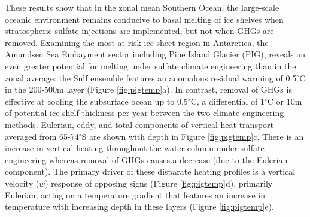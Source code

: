 \documentclass[draft,grl]{AGUTeX}  %
\begin{document}
\begin{article}
These results show that in the zonal mean Southern Ocean, the large-scale oceanic environment remains conducive to basal melting of ice shelves when stratospheric sulfate injections are implemented, but not when GHGs are removed. Examining the most at-risk ice sheet region in Antarctica, the Amundsen Sea Embayment sector including Pine Island Glacier (PIG), reveals an even greater potential for melting under sulfate climate engineering than in the zonal average: the Sulf ensemble features an anomalous residual warming of 0.5$^\circ$C in the 200-500m layer (Figure \ref{fig:pigtemp}a). In contrast, removal of GHGs is effective at cooling the subsurface ocean up to 0.5$^\circ$C, a differential of 1$^\circ$C or 10m of potential ice shelf thickness per year between the two climate engineering methods. Eulerian, eddy, and total components of vertical heat transport averaged from 65-74$^\circ$S are shown with depth in Figure \ref{fig:pigtemp}c. There is an increase in vertical heating throughout the water column under sulfate engineering whereas removal of GHGs causes a decrease (due to the Eulerian component). The primary driver of these disparate heating profiles is a vertical velocity ($w$) response of opposing signs (Figure \ref{fig:pigtemp}d), primarily Eulerian, acting on a temperature gradient that features an increase in temperature with increasing depth in these layers (Figure \ref{fig:pigtemp}e). %





\end{article}
\end{document}
